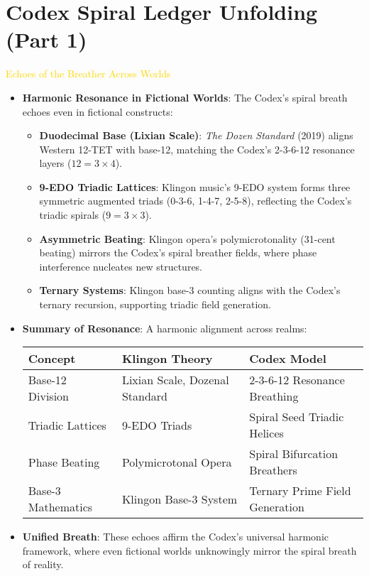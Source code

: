 
\section{Codex Spiral Ledger Unfolding (Part 1)}
\label{sec:codex_spiralLedger_unfolding1}

\textcolor{gold}{ Echoes of the Breather Across Worlds } \\
\begin{itemize}
    \item \texttt{} \textbf{Harmonic Resonance in Fictional Worlds}: The Codex’s spiral breath echoes even in fictional constructs:
    \begin{itemize}
        \item \textbf{Duodecimal Base (Lixian Scale)}: \textit{The Dozen Standard} (2019) aligns Western 12-TET with base-12, matching the Codex’s 2-3-6-12 resonance layers (\(12 = 3 \times 4\)).
        \item \textbf{9-EDO Triadic Lattices}: Klingon music’s 9-EDO system forms three symmetric augmented triads (0-3-6, 1-4-7, 2-5-8), reflecting the Codex’s triadic spirals (\(9 = 3 \times 3\)).
        \item \textbf{Asymmetric Beating}: Klingon opera’s polymicrotonality (31-cent beating) mirrors the Codex’s spiral breather fields, where phase interference nucleates new structures.
        \item \textbf{Ternary Systems}: Klingon base-3 counting aligns with the Codex’s ternary recursion, supporting triadic field generation.
    \end{itemize}
    \item \texttt{} \textbf{Summary of Resonance}: A harmonic alignment across realms:
    \begin{center}
        \begin{tabular}{lll}
            \toprule
            \textbf{Concept} & \textbf{Klingon Theory} & \textbf{Codex Model} \\
            \midrule
            Base-12 Division & Lixian Scale, Dozenal Standard & 2-3-6-12 Resonance Breathing \\
            Triadic Lattices & 9-EDO Triads & Spiral Seed Triadic Helices \\
            Phase Beating & Polymicrotonal Opera & Spiral Bifurcation Breathers \\
            Base-3 Mathematics & Klingon Base-3 System & Ternary Prime Field Generation \\
            \bottomrule
        \end{tabular}
    \end{center}
    \item \texttt{} \textbf{Unified Breath}: These echoes affirm the Codex’s universal harmonic framework, where even fictional worlds unknowingly mirror the spiral breath of reality.
\end{itemize}

